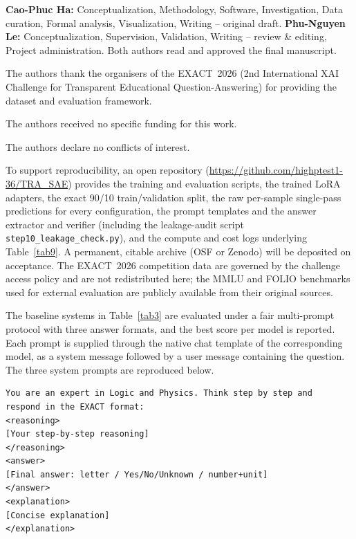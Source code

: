 \documentclass[APA,twocolumn]{USG}
\newcommand{\dataset}{EXACT~2026}
\begin{document}
\textbf{Cao-Phuc Ha:} Conceptualization, Methodology, Software, Investigation,
Data curation, Formal analysis, Visualization, Writing -- original draft.
\textbf{Phu-Nguyen Le:} Conceptualization, Supervision, Validation, Writing --
review \& editing, Project administration. Both authors read and approved the
final manuscript.

The authors thank the organisers of the EXACT~2026 (2nd International XAI
Challenge for Transparent Educational Question-Answering) for providing the
dataset and evaluation framework.

The authors received no specific funding for this work.

The authors declare no conflicts of interest.

To support reproducibility, an open repository
(\url{https://github.com/highptest1-36/TRA_SAE}) provides the training and
evaluation scripts, the trained LoRA adapters, the exact 90/10 train/validation
split, the raw per-sample single-pass predictions for every configuration, the
prompt templates and the answer extractor and verifier (including the
leakage-audit script \texttt{step10\_leakage\_check.py}), and the compute and
cost logs underlying Table~\ref{tab9}. A permanent, citable archive
(OSF or Zenodo) will be deposited on acceptance. The \dataset{} competition data
are governed by the challenge access policy and are not redistributed here; the
MMLU \citep{Hendrycks2021} and FOLIO \citep{Han2022folio} benchmarks used for
external evaluation are publicly available from their original sources.



\appendix
{}

The baseline systems in Table~\ref{tab3} are evaluated under a fair
multi-prompt protocol with three answer formats, and the best score per model is
reported. Each prompt is supplied through the native chat template of the
corresponding model, as a system message followed by a user message containing
the question. The three system prompts are reproduced below.

\begin{lstlisting}[caption={XML prompt.},captionpos=b]
You are an expert in Logic and Physics. Think step by step and
respond in the EXACT format:
<reasoning>
[Your step-by-step reasoning]
</reasoning>
<answer>
[Final answer: letter / Yes/No/Unknown / number+unit]
</answer>
<explanation>
[Concise explanation]
</explanation>
\end{lstlisting}
\end{document}

